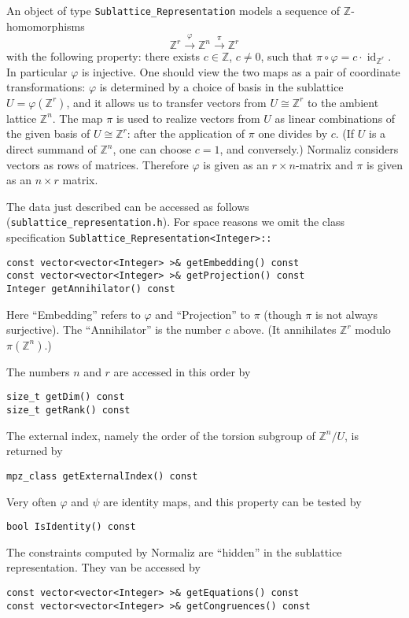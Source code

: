 \documentclass[12pt,a4paper]{scrartcl}
\theoremstyle{definition}
\let\phi=\varphi
\def\ZZ{{\mathbb Z}}
\begin{document}
\begin{small}
An object of type \verb|Sublattice_Representation| models a sequence of $\ZZ$-homomorphisms
$$
\ZZ^r\xrightarrow{\phi}\ZZ^n\xrightarrow{\pi}\ZZ^r
$$
with the following property: there exists $c\in\ZZ$, $c\neq 0$, such that $\pi\circ \phi=c\cdot\operatorname{id}_{\ZZ^r}$. In particular $\phi$ is injective. One should view the two maps as a pair of coordinate transformations: $\phi$ is determined by a choice of basis in the sublattice $U=\phi(\ZZ^r)$, and it allows us to transfer vectors from $U\cong \ZZ^r$ to the ambient lattice $\ZZ^n$. The map $\pi$ is used to realize vectors from $U$ as linear combinations of the given basis of $U\cong\ZZ^r$: after the application of $\pi$ one divides by $c$. (If $U$ is a direct summand of $\ZZ^n$, one can choose $c=1$, and conversely.) Normaliz considers vectors as rows of matrices. Therefore $\phi$ is given as an $r\times n$-matrix and $\pi$ is given as an $n\times r$ matrix.

The data just described can be accessed as follows (\verb|sublattice_representation.h|). For space reasons we omit the class specification \verb|Sublattice_Representation<Integer>::|
\begin{Verbatim}
const vector<vector<Integer> >& getEmbedding() const
const vector<vector<Integer> >& getProjection() const
Integer getAnnihilator() const
\end{Verbatim}
Here ``Embedding'' refers to $\phi$ and ``Projection'' to $\pi$ (though $\pi$ is not always surjective). The ``Annihilator'' is the number $c$ above. (It annihilates $\ZZ^r$ modulo $\pi(\ZZ^n)$.)

The numbers $n$ and $r$ are accessed in this order by
\begin{Verbatim}
size_t getDim() const
size_t getRank() const
\end{Verbatim}
The external index, namely the order of the torsion subgroup of $\ZZ^n/U$, is returned by
\begin{Verbatim}
mpz_class getExternalIndex() const
\end{Verbatim}
Very often $\phi$ and $\psi$ are identity maps, and this property can be tested by
\begin{Verbatim}
bool IsIdentity() const
\end{Verbatim}
The constraints computed by Normaliz are ``hidden'' in the sublattice representation. They van be accessed by
\begin{Verbatim}
const vector<vector<Integer> >& getEquations() const
const vector<vector<Integer> >& getCongruences() const
\end{Verbatim}


\end{small}
\end{document}
